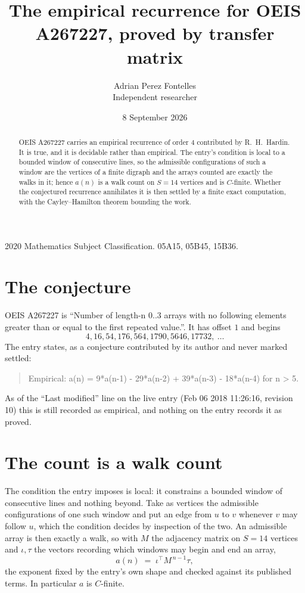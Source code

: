 \documentclass[11pt,a4paper]{article}
\title{The empirical recurrence for OEIS A267227, proved by transfer matrix}
\author{Adrian Perez Fontelles\\ \small Independent researcher}
\date{8 September 2026}
\theoremstyle{plain}
\theoremstyle{definition}
\begin{document}
\maketitle

\begin{abstract}
OEIS A267227 carries an empirical recurrence of order $4$ contributed by R.~H.~Hardin. It is
true, and it is decidable rather than empirical. The entry's condition is local to a bounded window of consecutive lines, so
the admissible configurations of such a window are the vertices of a finite digraph and the
arrays counted are exactly the walks in it; hence $a(n)$ is a walk count on $S=14$ vertices
and is $C$-finite. Whether the conjectured recurrence annihilates it is then settled by a
finite exact computation, with the Cayley--Hamilton theorem bounding the work.
\end{abstract}

\noindent\small 2020 Mathematics Subject Classification. 05A15, 05B45, 15B36.\normalsize

\section{The conjecture}

OEIS A267227 is ``Number of length-n 0..3 arrays with no following elements greater than or equal to the first repeated value.''. It has offset $1$ and begins
\[
4, 16, 54, 176, 564, 1790, 5646, 17732,\ \dots
\]
The entry states, as a conjecture contributed by its author and never marked settled:
\begin{quote}
Empirical: a(n) = 9*a(n-1) - 29*a(n-2) + 39*a(n-3) - 18*a(n-4) for n > 5.
\end{quote}
As of the ``Last modified'' line on the live entry (Feb 06 2018 11:26:16, revision 10) this is still
recorded as empirical, and nothing on the entry records it as proved.

\section{The count is a walk count}

The condition the entry imposes is local: it constrains a bounded window of consecutive lines and nothing beyond. Take as
vertices the admissible configurations of one such window and put an edge from $u$ to $v$
whenever $v$ may follow $u$, which the condition decides by inspection of the two. An
admissible array is then exactly a walk, so with $M$ the adjacency matrix on $S=14$ vertices
and $\iota,\tau$ the vectors recording which windows may begin and end an array,
\[
a(n)\;=\;\iota^{\!\top}M^{\,n-1}\tau ,
\]
the exponent fixed by the entry's own shape and checked against its published terms. In
particular $a$ is $C$-finite.
\end{document}
